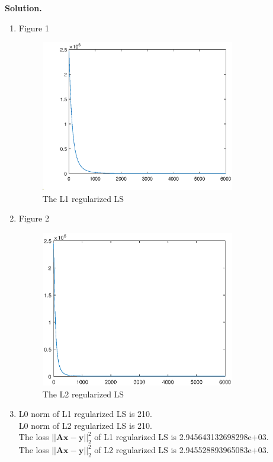 \documentclass[english,onecolumn]{IEEEtran}
\begin{document}
\noindent
\textbf{Solution.}
\begin{enumerate}
		\item Figure 1
			\begin{figure}[htbp]
				\centering
				\includegraphics[width=0.8\textwidth]{fig1_1.eps}
				\caption{The L1 regularized LS}
			\end{figure}
		\item Figure 2
			\begin{figure}[htbp]
				\centering
				\includegraphics[width=0.8\textwidth]{fig1_2.eps}
				\caption{The L2 regularized LS}
			\end{figure}
		\item
				L0 norm of L1 regularized LS is 210.\\
				L0 norm of L2 regularized LS is 210.\\
				The loss $||\mathbf{Ax-y}||^{2}_{2}$ of L1 regularized LS is 2.945643132698298e+03.\\
				The loss $||\mathbf{Ax-y}||^{2}_{2}$ of L2 regularized LS is 2.945528893965083e+03.\\

\end{enumerate}
\newpage
\end{document}
